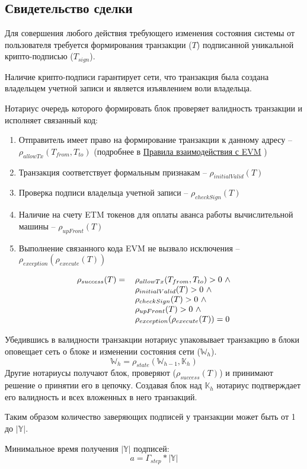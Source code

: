 \documentclass[12pt]{report}
\begin{document}
\subsection{Свидетельство сделки}
\label{tech-blockchain-confirmation}
\begin{multicols}{2}
Для совершения любого действия требующего изменения состояния системы от пользователя требуется формирования транзакции ($T$) подписанной уникальной крипто-подписью ($T_{sign}$). 

Наличие крипто-подписи гарантирует сети, что транзакция была создана владельцем учетной записи и является изъявлением воли владельца.

Нотариус очередь которого формировать блок проверяет валидность транзакции и исполняет связанный код:
\begin{enumerate}
\item Отправитель имеет право на формирование транзакции к данному адресу – $\rho_{allowTx}(T_{from}, T_{to})$ (подробнее в \hyperref[tech-blockchain-rules]{Правила взаимодействия с EVM}		)
\item Транзакция соответствует формальным признакам –  $\rho_{initialValid}(T)$
\item Проверка подписи владельца учетной записи –  $\rho_{checkSign}(T)$
\item Наличие на счету ETM токенов для оплаты аванса работы вычислительной машины – $\rho_{upFront}(T)$
\item Выполнение связанного кода EVM не вызвало исключения – $\rho_{exception}(\rho_{execute}(T))$
\end{enumerate}
\end{multicols}
\begin{equation}
\begin{tabular}{ r l }
$\rho_{success}(T) =$ & $\rho_{allowTx}(T_{from}, T_{to}) > 0 \ \wedge $ \\
 \ & $\rho_{initialValid}(T) > 0 \ \wedge $ \\
 \ & $\rho_{checkSign}(T) > 0 \ \wedge $ \\
 \ & $\rho_{upFront}(T) > 0 \ \wedge $ \\
 \ & $\rho_{exception}(\rho_{execute}(T)) = 0 $
\end{tabular}
\end{equation}
\begin{multicols}{2}
Убедившись в валидности транзакции нотариус упаковывает транзакцию в блоки оповещает сеть о блоке и изменении состояния сети ($\mathbb{W}_h$).
\begin{equation}
\mathbb{W}_h = \rho_{state}(\mathbb{W}_{h-1}, \mathbb{K}_h)
\end{equation}
Другие нотариусы получают блок, проверяют ($\rho_{success}(T)$) и принимают решение о принятии его в цепочку. Создавая блок над $\mathbb{K}_h$ нотариус подтверждает его валидность и всех вложенных в него транзакций.

Таким образом количество заверяющих подписей у транзакции может быть от 1 до $|\mathbb{Y}|$.

Минимальное время получения $|\mathbb{Y}|$ подписей:
\begin{equation}
a = \Gamma_{step} * |\mathbb{Y}|
\end{equation}
\end{multicols}
\end{document}

